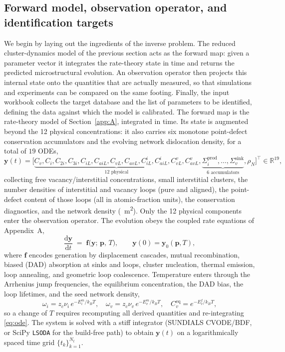 \documentclass{article}
\newcommand{\R}{\mathbb{R}}
\newcommand{\param}{\bm{p}}
\begin{document}
\subsection{Forward model, observation operator, and identification targets}
We begin by laying out the ingredients of the inverse problem. The reduced cluster-dynamics model of the previous section acts as the forward map: given a parameter vector it integrates the rate-theory state in time and returns the predicted microstructural evolution. An observation operator then projects this internal state onto the quantities that are actually measured, so that simulations and experiments can be compared on the same footing. Finally, the input workbook collects the target database and the list of parameters to be identified, defining the data against which the model is calibrated.
The forward map is the rate-theory model of Section~\ref{app:A}, integrated
in time. Its state is augmented beyond the 12 physical concentrations: it also
carries six monotone point-defect conservation accumulators and the evolving
network dislocation density, for a total of $19$ ODEs,
\begin{equation}
  \bm{y}(t)=\big[\underbrace{C_v,C_i,C_{2i},C_{3i},
  C_{iL},C_{aiL},C_{vL},C_{avL},
  C_{iL}^{i},C_{aiL}^{i},C_{vL}^{v},C_{avL}^{v}}_{\text{12 physical}},
  \underbrace{\Sigma^{\mathrm{prod}}_i,\dots,\Sigma^{\mathrm{sink}}_v}_{\text{6 accumulators}},
  \rho_N\big]^{\!\top}\in\R^{19},
\end{equation}
collecting free vacancy/interstitial concentrations, small interstitial clusters,
the number densities of interstitial and vacancy loops (pure and aligned),
the point-defect content of those loops (all in atomic-fraction units), the
conservation diagnostics, and the network density (\si{\per\square\metre}). Only
the 12 physical components enter the observation operator. The evolution obeys
the coupled rate equations of Appendix~A,
\begin{equation}
  \frac{\mathrm{d}\bm{y}}{\mathrm{d}t}
  \;=\;\bm{f}\!\big(\bm{y};\,\param,\,T\big),
  \qquad \bm{y}(0)=\bm{y}_0(\param,T),
  \label{eq:ode}
\end{equation}
where $\bm{f}$ encodes generation by displacement cascades, mutual recombination,
biased (DAD) absorption at sinks and loops, cluster nucleation, thermal emission,
loop annealing, and geometric loop coalescence. Temperature enters through the
Arrhenius jump frequencies, the equilibrium concentration, the DAD bias, the loop
lifetimes, and the seed network density,
\begin{equation}
  \omega_{i}=z_c\nu_i\,e^{-E^m_i/k_BT},\quad
  \omega_{v}=z_c\nu_v\,e^{-E^m_v/k_BT},\quad
  C_v^{\mathrm{eq}}=e^{-E^f_v/k_BT},
  \label{eq:arrhenius}
\end{equation}
so a change of $T$ requires recomputing all derived quantities and re-integrating
\eqref{eq:ode}. The system is solved with a stiff integrator (SUNDIALS CVODE/BDF,
or SciPy \texttt{LSODA} for the build-free path) to obtain $\bm{y}(t)$ on a
logarithmically spaced time grid $\{t_k\}_{k=1}^{N_t}$.
\end{document}
